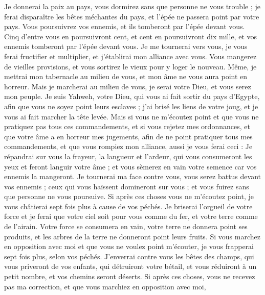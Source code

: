 \begin{multicols}{2}
Je donnerai la paix au pays, vous dormirez sans que personne ne vous trouble ; je ferai disparaître les bêtes méchantes du pays, et l'épée ne passera point par votre pays.
Vous poursuivrez vos ennemis, et ils tomberont par l'épée devant vous.
Cinq d'entre vous en poursuivront cent, et cent en poursuivront dix mille, et vos ennemis tomberont par l'épée devant vous.
Je me tournerai vers vous, je vous ferai fructifier et multiplier, et j'établirai mon alliance avec vous.
Vous mangerez de vieilles provisions, et vous sortirez le vieux pour y loger le nouveau.
Même, je mettrai mon tabernacle au milieu de vous, et mon âme ne vous aura point en horreur.
Mais je marcherai au milieu de vous, je serai votre Dieu, et vous serez mon peuple.
Je suis Yahweh, votre Dieu, qui vous ai fait sortir du pays d'Egypte, afin que vous ne soyez point leurs esclaves ; j'ai brisé les liens de votre joug, et je vous ai fait marcher la tête levée.
Mais si vous ne m'écoutez point et que vous ne pratiquez pas tous ces commandements,
et si vous rejetez mes ordonnances, et que votre âme a en horreur mes jugements, afin de ne point pratiquer tous mes commandements, et que vous rompiez mon alliance,
aussi je vous ferai ceci : Je répandrai sur vous la frayeur, la langueur et l'ardeur, qui vous consumeront les yeux et feront languir votre âme ; et vous sèmerez en vain votre semence car vos ennemis la mangeront.
Je tournerai ma face contre vous, vous serez battus devant vos ennemis ; ceux qui vous haïssent domineront sur vous ; et vous fuirez sans que personne ne vous poursuive.
Si après ces choses vous ne m'écoutez point, je vous châtierai sept fois plus à cause de vos péchés.
Je briserai l'orgueil de votre force et je ferai que votre ciel soit pour vous comme du fer, et votre terre comme de l'airain.
Votre force se consumera en vain, votre terre ne donnera point ses produits, et les arbres de la terre ne donneront point leurs fruits.
Si vous marchez en opposition avec moi et que vous ne voulez point m'écouter, je vous frapperai sept fois plus, selon vos péchés.
J'enverrai contre vous les bêtes des champs, qui vous priveront de vos enfants, qui détruiront votre bétail, et vous réduiront à un petit nombre, et vos chemins seront déserts.
Si après ces choses, vous ne recevez pas ma correction, et que vous marchiez en opposition avec moi,

\end{multicols}
